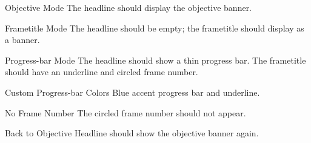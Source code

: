 \documentclass[aspectratio=169]{beamer}
\begin{document}
\begin{frame}{Objective Mode}
  The headline should display the objective banner.
\end{frame}

\begin{frame}{Frametitle Mode}
  The headline should be empty; the frametitle should display as a banner.
\end{frame}

\begin{frame}{Progress-bar Mode}
  The headline should show a thin progress bar.
  The frametitle should have an underline and circled frame number.
\end{frame}

\begin{frame}{Custom Progress-bar Colors}
  Blue accent progress bar and underline.
\end{frame}

\begin{frame}{No Frame Number}
  The circled frame number should not appear.
\end{frame}

\begin{frame}{Back to Objective}
  Headline should show the objective banner again.
\end{frame}
\end{document}

